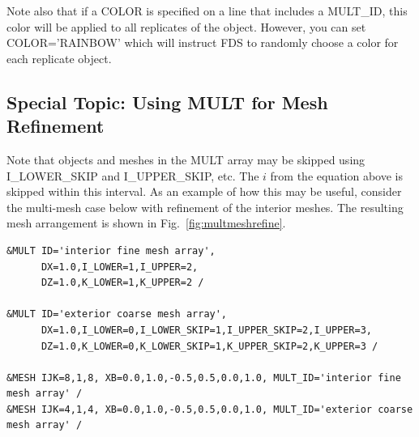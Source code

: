 \documentclass[11pt]{book}
\begin{document}
Note also that if a {\ct COLOR} is specified on a line that includes a {\ct MULT\_ID}, this color will be applied to all replicates of the object. However, you can set {\ct COLOR='RAINBOW'} which will instruct FDS to randomly choose a color for each replicate object.

\subsection{Special Topic: Using {\ct MULT} for Mesh Refinement}
\label{info:multmeshrefine}

Note that objects and meshes in the {\ct MULT} array may be skipped using {\ct I\_LOWER\_SKIP} and {\ct I\_UPPER\_SKIP}, etc.  The $i$ from the equation above is skipped within this interval.  As an example of how this may be useful, consider the multi-mesh case below with refinement of the interior meshes.  The resulting mesh arrangement is shown in Fig.~\ref{fig:multmeshrefine}.

\begin{lstlisting}
&MULT ID='interior fine mesh array',
      DX=1.0,I_LOWER=1,I_UPPER=2,
      DZ=1.0,K_LOWER=1,K_UPPER=2 /

&MULT ID='exterior coarse mesh array',
      DX=1.0,I_LOWER=0,I_LOWER_SKIP=1,I_UPPER_SKIP=2,I_UPPER=3,
      DZ=1.0,K_LOWER=0,K_LOWER_SKIP=1,K_UPPER_SKIP=2,K_UPPER=3 /

&MESH IJK=8,1,8, XB=0.0,1.0,-0.5,0.5,0.0,1.0, MULT_ID='interior fine mesh array' /
&MESH IJK=4,1,4, XB=0.0,1.0,-0.5,0.5,0.0,1.0, MULT_ID='exterior coarse mesh array' /
\end{lstlisting}

\baselineskip
\end{document}
